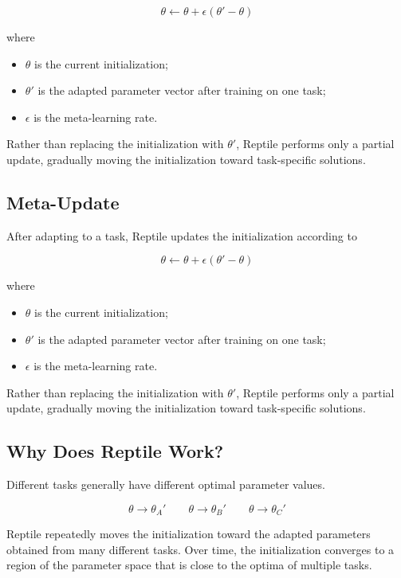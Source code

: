 \[
\boxed{
\theta
\leftarrow
\theta
+
\epsilon
(\theta'-\theta)
}
\]

where

\begin{itemize}
\item $\theta$ is the current initialization;
\item $\theta'$ is the adapted parameter vector after training on one task;
\item $\epsilon$ is the meta-learning rate.
\end{itemize}

Rather than replacing the initialization with $\theta'$, Reptile performs only a partial update, gradually moving the initialization toward task-specific solutions.
\subsection*{Meta-Update}

After adapting to a task, Reptile updates the initialization according to

\[
\boxed{
\theta
\leftarrow
\theta
+
\epsilon
(\theta'-\theta)
}
\]

where

\begin{itemize}
\item $\theta$ is the current initialization;
\item $\theta'$ is the adapted parameter vector after training on one task;
\item $\epsilon$ is the meta-learning rate.
\end{itemize}

Rather than replacing the initialization with $\theta'$, Reptile performs only a partial update, gradually moving the initialization toward task-specific solutions.
\subsection*{Why Does Reptile Work?}

Different tasks generally have different optimal parameter values.

\[
\theta
\rightarrow
\theta_A'
\qquad
\theta
\rightarrow
\theta_B'
\qquad
\theta
\rightarrow
\theta_C'
\]

Reptile repeatedly moves the initialization toward the adapted parameters obtained from many different tasks. Over time, the initialization converges to a region of the parameter space that is close to the optima of multiple tasks.

